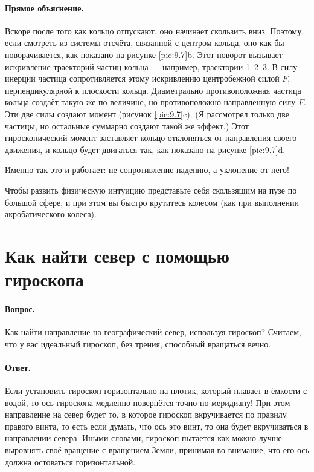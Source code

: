 \paragraph{Прямое объяснение.}
Вскоре после того как кольцо отпускают, оно начинает скользить вниз.
Поэтому, если смотреть из системы отсчёта, связанной с центром кольца, оно как бы поворачивается, как показано на рисунке \ref{pic:9.7}b.
Этот поворот вызывает искривление траекторий частиц кольца --- например, траектории 1–2–3.
В силу инерции частица сопротивляется этому искривлению центробежной силой $F$, перпендикулярной к плоскости кольца.
Диаметрально противоположная частица кольца создаёт такую же по величине, но противоположно направленную силу $F$.
Эти две силы создают момент (рисунок \ref{pic:9.7}c).
(Я рассмотрел только две частицы, но остальные суммарно создают такой же эффект.)
Этот гироскопический момент заставляет кольцо отклоняться от направления своего движения, и кольцо будет двигаться так, как показано на рисунке \ref{pic:9.7}d.

Именно так это и работает: не сопротивление падению, а уклонение от него!

Чтобы развить физическую интуицию
представьте себя скользящим на пузе по большой сфере, и при этом вы быстро крутитесь колесом (как при выполнении акробатического колеса).

\section{Как найти север с помощью гироскопа}

\paragraph{Вопрос.}
Как найти направление на географический север, используя гироскоп?
Считаем, что у вас идеальный гироскоп, без трения, способный вращаться вечно.

\paragraph{Ответ.}
Если установить гироскоп горизонтально на плотик, который плавает в ёмкости с водой,
то ось гироскопа медленно повернётся точно по меридиану!
При этом направление на север будет то, в которое гироскоп вкручивается по правилу правого винта, то есть если думать, что ось это винт, то она будет вкручиваться в направлении севера.
Иными словами, гироскоп пытается как можно лучше выровнять своё вращение с вращением Земли, принимая во внимание, что его ось должна остоваться горизонтальной.

